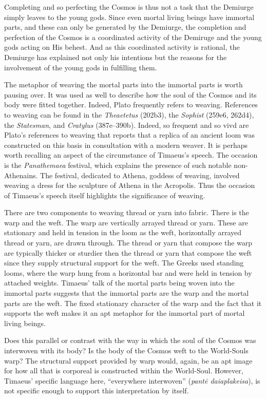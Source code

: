 Completing and so perfecting the Cosmos is thus not a task that the Demiurge simply leaves to the young gods. Since even mortal living beings have immortal parts, and these can only be generated by the Demiurge, the completion and perfection of the Cosmos is a coordinated activity of the Demiruge and the young gods acting on His behest. And as this coordinated activity is rational, the Demiurge has explained not only his intentions but the reasons for the involvement of the young gods in fulfilling them.

The metaphor of weaving the mortal parts into the immortal parts is worth pausing over. It was used as well to describe how the soul of the Cosmos and its body were fitted together. Indeed, Plato frequently refers to weaving. References to weaving can be found in the \emph{Theaetetus} (202b3), the \emph{Sophist} (259e6, 262d4), the \emph{Statesman}, and \emph{Cratylus} (387e--390b). Indeed, so frequent and so vivd are Plato's references to weaving that \citet[44, n1]{Skemp:1952aa} reports that a replica of an ancient loom was constructed on this basis in consultation with a modern weaver. It is perhaps worth recalling an aspect of the circumstance of Timaeus's speech. The occasion is the \emph{Panathemaea} festival, which explains the presence of such notable non-Athenains. The festival, dedicated to Athena, goddess of weaving, involved weaving a dress for the sculpture of Athena in the Acropolis. Thus the occasion of Timaeus's speech itself highlights the significance of weaving. 

There are two components to weaving thread or yarn into fabric. There is the warp and the weft. The warp are vertically arrayed thread or yarn. These are stationary and held in tension in the loom as the weft, horizontally arrayed thread or yarn, are drawn through. The thread or yarn that compose the warp are typically thicker or sturdier then the thread or yarn that compose the weft since they supply structural support for the weft. The Greeks used standing looms, where the warp hung from a horizontal bar and were held in tension by attached weights. Timaeus' talk of the mortal parts being woven into the immortal parts suggests that the immortal parts are the warp and the mortal parts are the weft. The fixed stationary character of the warp and the fact that it supports the weft makes it an apt metaphor for the immortal part of mortal living beings. 

Does this parallel or contrast with the way in which the soul of the Cosmos was interwoven with its body? Is the body of the Cosmos weft to the World-Souls warp? The structural support provided by warp would, again, be an apt image for how all that is corporeal is constructed within the World-Soul. However, Timaeus' specific language here, ``everywhere interwoven'' (\emph{pantē daiaplakeisa}), is not specific enough to support this interpretation by itself.

